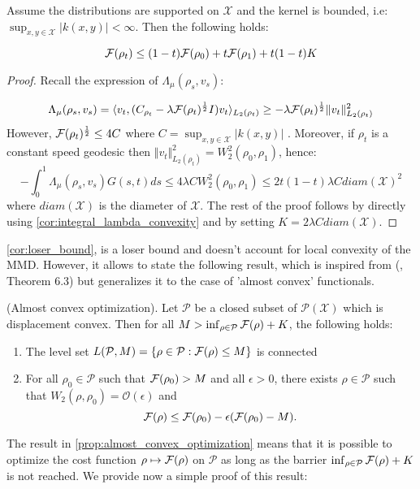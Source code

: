 %
\begin{corollary}
\label{cor:loser_bound}Assume the distributions are supported on
$\mathcal{X}$ and the kernel is bounded, i.e: $\sup_{x,y\in\mathcal{X}}\vert k(x,y)\vert<\infty$.
Then the following holds:

\[
{{\mathcal F}}(\rho_{t})\leq(1-t){{\mathcal F}}(\rho_{0})+t{{\mathcal F}}(\rho_{1})+t(1-t)K
\]
\end{corollary}
%
\begin{proof}
Recall the expression of $\Lambda_{\mu}(\rho_{s},v_{s}):$

\[
\Lambda_{\mu}(\rho_{s},v_{s})=\langle v_{t},(C_{\rho_{t}}-\lambda {{\mathcal F}}(\rho_{t})^\frac{1}{2} I)v_{t}\rangle_{L_{2}(\rho_{t})}\geq-\lambda {{\mathcal F}}(\rho_{t})^\frac{1}{2}\Vert v_{t}\Vert_{L_{2}(\rho_{t})}^{2}
\]
However, ${{\mathcal F}}(\rho_{t})^\frac{1}{2}\leq4C$ where $C=\sup_{x,y\in\mathcal{X}}\vert k(x,y)\vert$
. Moreover, if $\rho_{t}$ is a constant speed geodesic then $\Vert v_{t}\Vert_{L_{2}(\rho_{t})}^{2}=W_{2}^{2}(\rho_{0},\rho_{1})$,
hence: 
\[
-\int_{0}^{1}\Lambda_{\mu}(\rho_{s},v_{s})G(s,t)ds\leq4\lambda CW_{2}^{2}(\rho_{0},\rho_{1})\leq2t(1-t)\lambda Cdiam(\mathcal{X})^{2}
\]
where $diam(\mathcal{X})$ is the diameter of $\mathcal{X}$. The rest of the proof follows by directly using \ref{cor:integral_lambda_convexity}
and by setting $K=2\lambda Cdiam(\mathcal{X})$.
\end{proof}
%
\ref{cor:loser_bound}, is a loser bound and doesn't account for local
convexity of the MMD. However, it allows to state the following result,
which is inspired from (\cite{Bottou:2017}, Theorem 6.3) but generalizes
it to the case of 'almost convex' functionals.
\begin{proposition}
\label{prop:almost_convex_optimization}
(Almost convex optimization). Let $\mathcal{P}$ be a closed subset
of $\mathcal{P}(\mathcal{X})$ which is displacement convex. Then
for all $M>\inf_{\rho\in\mathcal{P}}{{\mathcal F}}(\rho)+K$, the following
holds:
\end{proposition}
\begin{enumerate}
\item The level set $L(\mathcal{P},M)=\{\rho\in\mathcal{P}:{{\mathcal F}}(\rho)\leq M\}$
is connected
\item For all $\rho_{0}\in\mathcal{P}$ such that ${{\mathcal F}}(\rho_0)>M$
and all $\epsilon>0$, there exists $\rho\in\mathcal{P}$ such that
$W_{2}(\rho,\rho_{0})=\mathcal{O}(\epsilon)$ and
\[
{{\mathcal F}}(\rho)\leq {{\mathcal F}}(\rho_{0})-\epsilon({{\mathcal F}}(\rho_{0})-M).
\]
\end{enumerate}
%
\begin{remark}
The result in \ref{prop:almost_convex_optimization} means that it is possible to optimize the cost function $\rho\mapsto {{\mathcal F}}(\rho)$
on $\mathcal{P}$ as long as the barrier $\inf_{\rho\in\mathcal{P}}{{\mathcal F}}(\rho)+K$
is not reached. We provide now a simple proof of this result:
\end{remark}
